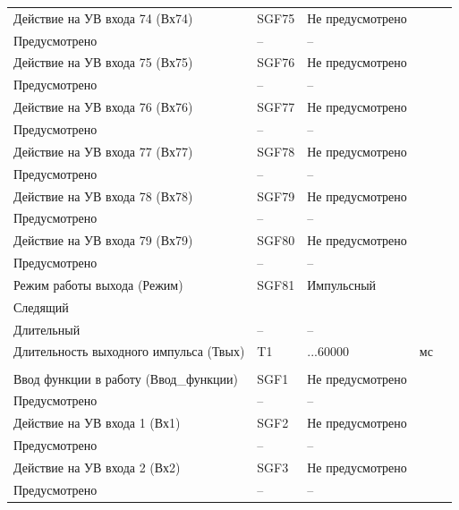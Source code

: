 \begin{longtable}{|>{\centering\arraybackslash}m{5.3cm}|>{\centering\arraybackslash}m{3.3cm}|>{\centering\arraybackslash}m{4.2cm}|>{\centering\arraybackslash}m{1.8cm}|>{\centering\arraybackslash}m{1cm}|}
\hline
\centering Действие на УВ входа 74 (Вх74)  & \centering SGF75 & \centering Не предусмотрено \\ Предусмотрено & \centering -- & \centering \arraybackslash -- \\
\hline
\centering Действие на УВ входа 75 (Вх75)  & \centering SGF76 & \centering Не предусмотрено \\ Предусмотрено & \centering -- & \centering \arraybackslash -- \\
\hline
\centering Действие на УВ входа 76 (Вх76)  & \centering SGF77 & \centering Не предусмотрено \\ Предусмотрено & \centering -- & \centering \arraybackslash -- \\
\hline
\centering Действие на УВ входа 77 (Вх77)  & \centering SGF78 & \centering Не предусмотрено \\ Предусмотрено & \centering -- & \centering \arraybackslash -- \\
\hline
\centering Действие на УВ входа 78 (Вх78)  & \centering SGF79 & \centering Не предусмотрено \\ Предусмотрено & \centering -- & \centering \arraybackslash -- \\
\hline
\centering Действие на УВ входа 79 (Вх79)  & \centering SGF80 & \centering Не предусмотрено \\ Предусмотрено & \centering -- & \centering \arraybackslash -- \\
\hline
\centering Режим работы выхода (Режим)  & \centering SGF81 & \centering Импульсный \\ Следящий \\ Длительный & \centering -- & \centering \arraybackslash -- \\
\hline
\centering Длительность выходного импульса (Твых)  & \centering T1 & \centering 50...60000 & \centering мс & \centering \arraybackslash 10 \\
\hline
\multicolumn{5}{|c|}{ УВ6 } \\ \hline 
\centering Ввод функции в работу (Ввод\_функции)  & \centering SGF1 & \centering Не предусмотрено \\ Предусмотрено & \centering -- & \centering \arraybackslash -- \\
\hline
\centering Действие на УВ входа 1 (Вх1)  & \centering SGF2 & \centering Не предусмотрено \\ Предусмотрено & \centering -- & \centering \arraybackslash -- \\
\hline
\centering Действие на УВ входа 2 (Вх2)  & \centering SGF3 & \centering Не предусмотрено \\ Предусмотрено & \centering -- & \centering \arraybackslash -- \\

\end{longtable}
